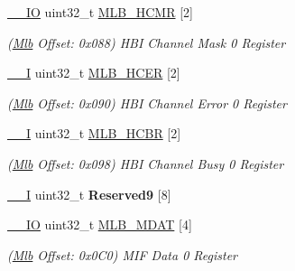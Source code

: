 \begin{DoxyCompactItemize}
\item 
\mbox{\label{structMlb_ab9cabc9c6ae17cf809efe178e6251c4f}} 
\mbox{\hyperlink{core__cm7_8h_aec43007d9998a0a0e01faede4133d6be}{\+\_\+\+\_\+\+IO}} uint32\+\_\+t \mbox{\hyperlink{structMlb_ab9cabc9c6ae17cf809efe178e6251c4f}{M\+L\+B\+\_\+\+H\+C\+MR}} \mbox{[}2\mbox{]}
\begin{DoxyCompactList}\small\item\em (\mbox{\hyperlink{structMlb}{Mlb}} Offset\+: 0x088) H\+BI Channel Mask 0 Register \end{DoxyCompactList}\item 
\mbox{\label{structMlb_a55f7956e2c6daba349c84f755d378841}} 
\mbox{\hyperlink{core__cm7_8h_af63697ed9952cc71e1225efe205f6cd3}{\+\_\+\+\_\+I}} uint32\+\_\+t \mbox{\hyperlink{structMlb_a55f7956e2c6daba349c84f755d378841}{M\+L\+B\+\_\+\+H\+C\+ER}} \mbox{[}2\mbox{]}
\begin{DoxyCompactList}\small\item\em (\mbox{\hyperlink{structMlb}{Mlb}} Offset\+: 0x090) H\+BI Channel Error 0 Register \end{DoxyCompactList}\item 
\mbox{\label{structMlb_a47e897a48743df63ac74cc4317f218b7}} 
\mbox{\hyperlink{core__cm7_8h_af63697ed9952cc71e1225efe205f6cd3}{\+\_\+\+\_\+I}} uint32\+\_\+t \mbox{\hyperlink{structMlb_a47e897a48743df63ac74cc4317f218b7}{M\+L\+B\+\_\+\+H\+C\+BR}} \mbox{[}2\mbox{]}
\begin{DoxyCompactList}\small\item\em (\mbox{\hyperlink{structMlb}{Mlb}} Offset\+: 0x098) H\+BI Channel Busy 0 Register \end{DoxyCompactList}\item 
\mbox{\label{structMlb_a81fe410b8ba34b4d5f91ac154a9efc45}} 
\mbox{\hyperlink{core__cm7_8h_af63697ed9952cc71e1225efe205f6cd3}{\+\_\+\+\_\+I}} uint32\+\_\+t {\bfseries Reserved9} \mbox{[}8\mbox{]}
\item 
\mbox{\label{structMlb_aeaa8c0e71f00784c759268a6fd59f96c}} 
\mbox{\hyperlink{core__cm7_8h_aec43007d9998a0a0e01faede4133d6be}{\+\_\+\+\_\+\+IO}} uint32\+\_\+t \mbox{\hyperlink{structMlb_aeaa8c0e71f00784c759268a6fd59f96c}{M\+L\+B\+\_\+\+M\+D\+AT}} \mbox{[}4\mbox{]}
\begin{DoxyCompactList}\small\item\em (\mbox{\hyperlink{structMlb}{Mlb}} Offset\+: 0x0\+C0) M\+IF Data 0 Register \end{DoxyCompactList}\item 

\end{DoxyCompactItemize}

